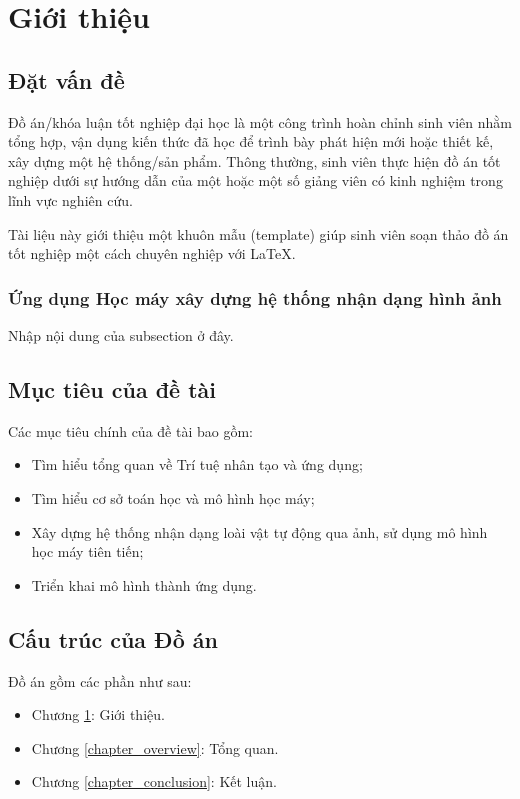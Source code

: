 \chapter {Giới thiệu}\label{chapter_intro}
	
\section{Đặt vấn đề}
Đồ án/khóa luận tốt nghiệp đại học là một công trình hoàn chỉnh sinh viên nhằm tổng hợp, vận dụng kiến thức đã học để trình bày phát hiện mới hoặc thiết kế, xây dựng một hệ thống/sản phẩm. Thông thường, sinh viên thực hiện đồ án tốt nghiệp dưới sự hướng dẫn của một hoặc một số giảng viên có kinh nghiệm trong lĩnh vực nghiên cứu.

Tài liệu này giới thiệu một khuôn mẫu (template) giúp sinh viên soạn thảo đồ án tốt nghiệp một cách chuyên nghiệp với \LaTeX \cite{van2010documentation}.

\subsection{Ứng dụng Học máy xây dựng hệ thống nhận dạng hình ảnh}
Nhập nội dung của subsection ở đây.

\section{Mục tiêu của đề tài}

Các mục tiêu chính của đề tài bao gồm:
\begin{itemize}
\item Tìm hiểu tổng quan về Trí tuệ nhân tạo và ứng dụng;
\item Tìm hiểu cơ sở toán học và mô hình học máy;
\item Xây dựng hệ thống nhận dạng loài vật tự động qua ảnh, sử dụng mô hình học máy tiên tiến;
\item Triển khai mô hình thành ứng dụng.
\end{itemize}

\section{Cấu trúc của Đồ án}
Đồ án gồm các phần như sau:
\begin{itemize}
\item Chương \ref{chapter_intro}: Giới thiệu. 
\item Chương \ref{chapter_overview}: Tổng quan.
\item Chương \ref{chapter_conclusion}: Kết luận.
\end{itemize}
